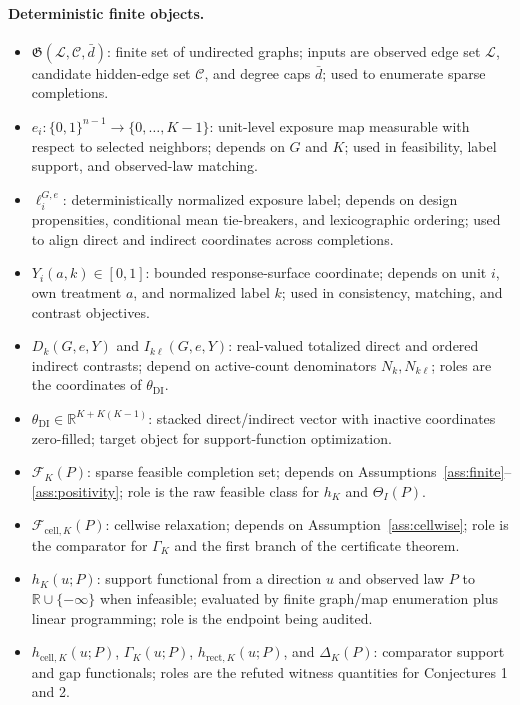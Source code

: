 \documentclass[11pt]{article}
\theoremstyle{definition}
\theoremstyle{plain}
\theoremstyle{remark}
\begin{document}
\paragraph{Deterministic finite objects.}
\begin{itemize}[leftmargin=*]
  \item \(\mathfrak G(\mathcal L,\mathcal C,\bar d)\): finite set of undirected graphs; inputs are observed edge set \(\mathcal L\), candidate hidden-edge set \(\mathcal C\), and degree caps \(\bar d\); used to enumerate sparse completions.
  \item \(e_i:\{0,1\}^{n-1}\to\{0,\ldots,K-1\}\): unit-level exposure map measurable with respect to selected neighbors; depends on \(G\) and \(K\); used in feasibility, label support, and observed-law matching.
  \item \(\ell_i^{G,e}\): deterministically normalized exposure label; depends on design propensities, conditional mean tie-breakers, and lexicographic ordering; used to align direct and indirect coordinates across completions.
  \item \(Y_i(a,k)\in[0,1]\): bounded response-surface coordinate; depends on unit \(i\), own treatment \(a\), and normalized label \(k\); used in consistency, matching, and contrast objectives.
  \item \(D_k(G,e,Y)\) and \(I_{k\ell}(G,e,Y)\): real-valued totalized direct and ordered indirect contrasts; depend on active-count denominators \(N_k,N_{k\ell}\); roles are the coordinates of \(\theta_{\mathrm{DI}}\).
  \item \(\theta_{\mathrm{DI}}\in\mathbb R^{K+K(K-1)}\): stacked direct/indirect vector with inactive coordinates zero-filled; target object for support-function optimization.
  \item \(\mathcal F_K(P)\): sparse feasible completion set; depends on Assumptions~\ref{ass:finite}--\ref{ass:positivity}; role is the raw feasible class for \(h_K\) and \(\Theta_I(P)\).
  \item \(\mathcal F_{\mathrm{cell},K}(P)\): cellwise relaxation; depends on Assumption~\ref{ass:cellwise}; role is the comparator for \(\Gamma_K\) and the first branch of the certificate theorem.
  \item \(h_K(u;P)\): support functional from a direction \(u\) and observed law \(P\) to \(\mathbb R\cup\{-\infty\}\) when infeasible; evaluated by finite graph/map enumeration plus linear programming; role is the endpoint being audited.
  \item \(h_{\mathrm{cell},K}(u;P)\), \(\Gamma_K(u;P)\), \(h_{\mathrm{rect},K}(u;P)\), and \(\Delta_K(P)\): comparator support and gap functionals; roles are the refuted witness quantities for Conjectures 1 and 2.

\end{itemize}
\end{document}

